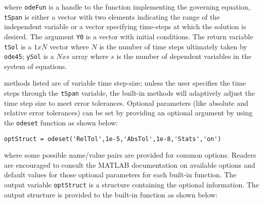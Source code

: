 \vspace{0.25cm}


\noindent where \lstinline[style=myMatlab]{odeFun} is a handle to the function implementing the governing equation, \lstinline[style=myMatlab]{tSpan} is either a vector with two elements indicating the range of the independent variable or a vector specifying time-steps at which the solution is desired. The argument \lstinline[style=myMatlab]{Y0} is a vector with initial conditions.  The return variable \lstinline[style=myMatlab]{tSol} is a $1xN$ vector where $N$ is the number of time steps ultimately taken by \lstinline[style=myMatlab]{ode45}; \lstinline[style=myMatlab]{ySol} is a $N x s$ array where $s$ is the number of dependent variables in the system of equations.

 methods listed are of variable time step-size; unless the user specifies the time steps through the \lstinline[style=myMatlab]{tSpan} variable, the built-in methods will adaptively adjust the time step size to meet error tolerances.  Optional parameters (like absolute and relative error tolerances) can be set by providing an optional argument by using the \lstinline[style=myMatlab]{odeset} function as shown below:

\vspace{0.25cm}

\noindent\parbox{\textwidth}{
\centering
\lstinline[style=myMatlab]{optStruct = odeset('RelTol',1e-5,'AbsTol',1e-8,'Stats','on')} 

}

\vspace{0.25cm}

\noindent where some possible name/value pairs are provided for common options.  Readers are encouraged to consult the MATLAB documentation on available options and default values for those optional parameters for each built-in function.  The output variable \lstinline[style=myMatlab]{optStruct} is a structure containing the optional information.  The output structure is provided to the built-in function as shown below:

\vspace{0.25cm}


